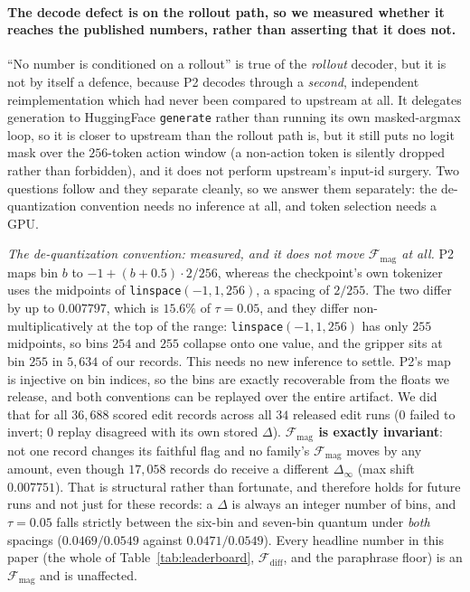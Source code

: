 \documentclass{article}
\begin{document}
\paragraph{The decode defect is on the rollout path, so we measured whether it reaches the published numbers, rather than asserting that it does not.} ``No number is conditioned on a rollout'' is true of the \emph{rollout} decoder, but it is not by itself a defence, because P2 decodes through a \emph{second}, independent reimplementation which had never been compared to upstream at all. It delegates generation to HuggingFace \texttt{generate} rather than running its own masked-argmax loop, so it is closer to upstream than the rollout path is, but it still puts no logit mask over the $256$-token action window (a non-action token is silently dropped rather than forbidden), and it does not perform upstream's input-id surgery. Two questions follow and they separate cleanly, so we answer them separately: the de-quantization convention needs no inference at all, and token selection needs a GPU.

\emph{The de-quantization convention: measured, and it does not move $\mathcal{F}_{\text{mag}}$ at all.} P2 maps bin $b$ to $-1 + (b{+}0.5)\cdot 2/256$, whereas the checkpoint's own tokenizer uses the midpoints of \texttt{linspace}$(-1,1,256)$, a spacing of $2/255$. The two differ by up to $0.007797$, which is $15.6\%$ of $\tau{=}0.05$, and they differ non-multiplicatively at the top of the range: \texttt{linspace}$(-1,1,256)$ has only $255$ midpoints, so bins $254$ and $255$ collapse onto one value, and the gripper sits at bin $255$ in $5{,}634$ of our records. This needs no new inference to settle. P2's map is injective on bin indices, so the bins are exactly recoverable from the floats we release, and both conventions can be replayed over the entire artifact. We did that for all $36{,}688$ scored edit records across all $34$ released edit runs ($0$ failed to invert; $0$ replay disagreed with its own stored $\Delta$). \textbf{$\mathcal{F}_{\text{mag}}$ is exactly invariant}: not one record changes its faithful flag and no family's $\mathcal{F}_{\text{mag}}$ moves by any amount, even though $17{,}058$ records do receive a different $\Delta_\infty$ (max shift $0.007751$). That is structural rather than fortunate, and therefore holds for future runs and not just for these records: a $\Delta$ is always an integer number of bins, and $\tau{=}0.05$ falls strictly between the six-bin and seven-bin quantum under \emph{both} spacings ($0.0469/0.0549$ against $0.0471/0.0549$). Every headline number in this paper (the whole of Table~\ref{tab:leaderboard}, $\mathcal{F}_{\text{diff}}$, and the paraphrase floor) is an $\mathcal{F}_{\text{mag}}$ and is unaffected.
\end{document}

